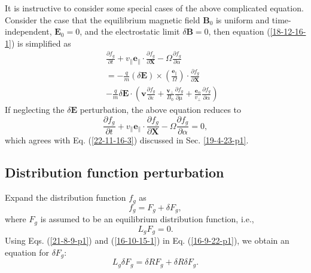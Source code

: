 \documentclass{llncs}
\newcommand{\tmmathbf}[1]{\ensuremath{\boldsymbol{#1}}}
\begin{document}
It is instructive to consider some special cases of the above complicated
equation. Consider the case that the equilibrium magnetic field $\mathbf{B}_0$
is uniform and time-independent, $\mathbf{E}_0 = 0$, and the electrostatic
limit $\delta \mathbf{B}= 0$, then equation (\ref{18-12-16-1}) is simplified
as
\begin{eqnarray}
  &  & \frac{\partial f_g}{\partial t} + v_{\parallel} \mathbf{e}_{\parallel}
  \cdot \frac{\partial f_g}{\partial \mathbf{X}} - \Omega \frac{\partial
  f_g}{\partial \alpha} \nonumber\\
  &  & = - \frac{q}{m} (\delta \mathbf{E}) \times \left(
  \frac{\tmmathbf{e}_{\parallel}}{\Omega}  \right) \cdot \frac{\partial
  f_g}{\partial \mathbf{X}} \\
  &  & - \frac{q}{m} \delta \mathbf{E} \cdot \left( \mathbf{v} \frac{\partial
  f_g}{\partial \varepsilon} + \frac{\mathbf{v}_{\perp}}{B_0}  \frac{\partial
  f_g}{\partial \mu} + \frac{\tmmathbf{e}_{\alpha}}{v_{\perp}}  \frac{\partial
  f_g}{\partial \alpha} \right) 
\end{eqnarray}
If neglecting the $\delta \mathbf{E}$ perturbation, the above equation reduces
to
\begin{equation}
  \frac{\partial f_g}{\partial t} + v_{\parallel} \mathbf{e}_{\parallel} \cdot
  \frac{\partial f_g}{\partial \mathbf{X}} - \Omega \frac{\partial
  f_g}{\partial \alpha} = 0,
\end{equation}
which agrees with Eq. (\ref{22-11-16-3}) discussed in Sec. \ref{19-4-23-p1}.

\subsection{Distribution function perturbation}

Expand the distribution function $f_g$ as
\begin{equation}
  \label{21-8-9-p1} f_g = F_g + \delta F_g,
\end{equation}
where $F_g$ is assumed to be an equilibrium distribution function, i.e.,
\begin{equation}
  \label{16-10-15-1} L_g F_g = 0.
\end{equation}
Using Eqs. (\ref{21-8-9-p1}) and (\ref{16-10-15-1}) in Eq. (\ref{16-9-22-p1}),
we obtain an equation for $\delta F_g$:
\begin{equation}
  \label{16-9-23-p1} L_g \delta F_g = \delta R F_g + \delta R \delta F_g .
\end{equation}
\end{document}
